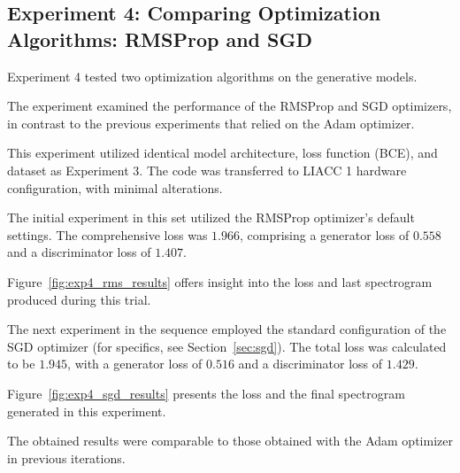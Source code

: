 \subsection{Experiment 4: Comparing Optimization Algorithms: RMSProp and SGD} \label{sec:exp4}

Experiment 4 tested two optimization algorithms on the generative models.

The experiment examined the performance of the RMSProp and \ac{SGD} optimizers, in contrast to the previous experiments that relied on the Adam optimizer.

This experiment utilized identical model architecture, loss function (\ac{BCE}), and dataset as Experiment 3. The code was transferred to \ac{LIACC} 1 hardware configuration, with minimal alterations.

The initial experiment in this set utilized the RMSProp optimizer's default settings. The comprehensive loss was $1.966$, comprising a generator loss of $0.558$ and a discriminator loss of $1.407$.

Figure~\ref{fig:exp4_rms_results} offers insight into the loss and last spectrogram produced during this trial.

The next experiment in the sequence employed the standard configuration of the \ac{SGD} optimizer (for specifics, see Section~\ref{sec:sgd}). The total loss was calculated to be $1.945$, with a generator loss of $0.516$ and a discriminator loss of $1.429$.

Figure~\ref{fig:exp4_sgd_results} presents the loss and the final spectrogram generated in this experiment.

The obtained results were comparable to those obtained with the Adam optimizer in previous iterations.

